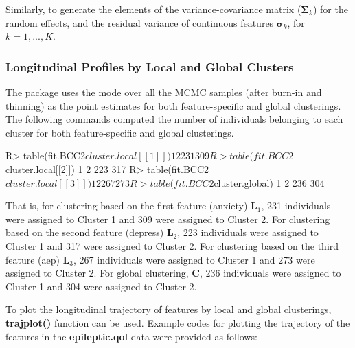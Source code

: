 Similarly,  to generate the elements of the variance-covariance matrix ($\boldsymbol{\Sigma}_k$) for the random effects, and    the residual variance of continuous features $\boldsymbol{\sigma}_k$, for $k=1,...,K$. 

\subsubsection{Longitudinal Profiles by Local and Global Clusters}
The package uses the mode over all the MCMC samples (after burn-in and thinning) as the point estimates for both feature-specific and global clusterings. The following commands computed the number of individuals belonging to each cluster for both feature-specific and global clusterings. 
\begin{example}
R> table(fit.BCC2$cluster.local[[1]])
  1   2 
231 309 
R> table(fit.BCC2$cluster.local[[2]])
  1   2 
223 317  
R> table(fit.BCC2$cluster.local[[3]])
  1   2 
267 273 
R> table(fit.BCC2$cluster.global)
  1   2 
236 304 
\end{example}

That is, for clustering based on the first feature (anxiety) $\boldsymbol{L}_1$, 231 individuals were assigned to Cluster 1 and 309 were assigned to Cluster 2. For clustering based on the second feature (depress) $\boldsymbol{L}_2$, 223 individuals were assigned to Cluster 1 and 317 were assigned to Cluster 2. For clustering based on the third feature (aep) $\boldsymbol{L}_3$, 267 individuals were assigned to Cluster 1 and 273 were assigned to Cluster 2. For global clustering, $\boldsymbol{C}$, 236 individuals were assigned to Cluster 1 and 304 were assigned to Cluster 2.

To plot the longitudinal trajectory of features by local and global clusterings, \textbf{trajplot()} function can be used. Example codes for plotting the trajectory of the features in the \textbf{epileptic.qol} data were provided as follows: 

